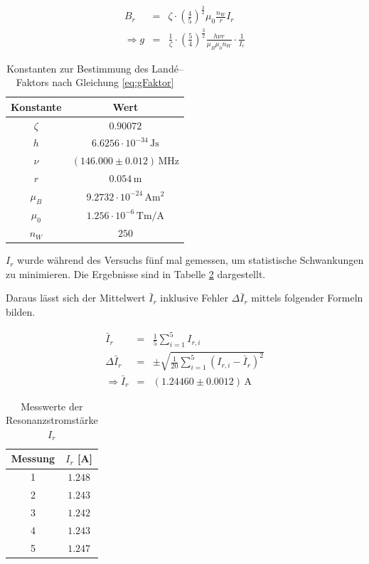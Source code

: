 \documentclass[12pt,a4paper]{scrartcl}
\numberwithin{equation}{section} %
\begin{document}
\begin{eqnarray}
	B_r &=& \zeta \cdot
			\left(\frac{4}{5}\right)^{\frac{3}{2}}
			\mu_0 \frac{n_W}{r} I_r
			\label{eq:b_r} \\
	\Rightarrow g &=& \frac{1}{\zeta} \cdot
			\left(\frac{5}{4}\right)^{\frac{3}{2}}
			\frac{h \nu r}{\mu_B \mu_0 n_W} \cdot \frac{1}{I_r}
			\label{eq:gFaktor}
\end{eqnarray}

\begin{table}[h!]
	\centering
	\begin{tabular}{c|c}
		Konstante & Wert \\
		\hline
		$\zeta$ & $0.90072$ \\
		$h$ & $6.6256 \cdot 10^{-34} \mathrm{\, Js}$ \\
		$\nu$ & $(146.000 \pm 0.012) \mathrm{\, MHz} $ \\
		$r$ & $0.054 \mathrm{\, m}$ \\
		$\mu_B$ & $9.2732 \cdot 10^{-24} \mathrm{\, Am^2}$ \\
		$\mu_0$ & $1.256 \cdot 10^{-6} \mathrm{\, Tm/A}$ \\
		$n_W$ & $250$ \\
	\end{tabular}
	\caption{Konstanten zur Bestimmung des Landé--Faktors nach Gleichung \eqref{eq:gFaktor}}
	\label{table:konstanten}
\end{table}

\noindent
$I_r$ wurde während des Versuchs fünf mal gemessen, um statistische Schwankungen zu minimieren. Die Ergebnisse sind in Tabelle \ref{table:I_r} dargestellt.

Daraus lässt sich der Mittelwert $\bar{I}_r$ inklusive Fehler $\Delta \bar{I}_r$ mittels folgender Formeln bilden.

\begin{eqnarray}
	\bar{I}_r &=& \frac{1}{5} \sum_{i=1}^{5} I_{r,i} \\
	\Delta \bar{I}_r &=& \pm\sqrt{\frac{1}{20} \sum_{i=1}^{5} (I_{r,i} - \bar{I}_r)^2} \\
	\Rightarrow \bar I_r &=& (1.24460 \pm 0.0012) \mathrm{\, A}
\end{eqnarray}

\begin{table}[h!]
	\centering
	\begin{tabular}{c|c}
		Messung & $I_r$ [A] \\
		\hline
		1 & $1.248$ \\
		2 & $1.243$ \\
		3 & $1.242$ \\
		4 & $1.243$ \\
		5 & $1.247$ \\
	\end{tabular}
	\caption{Messwerte der Resonanzstromstärke $I_r$}
	\label{table:I_r}
\end{table}
\end{document}
